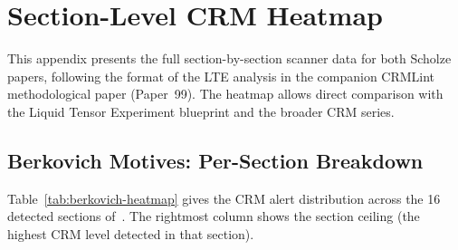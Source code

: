 \documentclass[11pt,a4paper]{article}
\theoremstyle{plain}
\theoremstyle{definition}
\begin{document}
\section{Section-Level CRM Heatmap}\label{app:heatmap}

This appendix presents the full section-by-section scanner data for both Scholze papers, following the format of the LTE analysis in the companion CRMLint methodological paper (Paper~99).  The heatmap allows direct comparison with the Liquid Tensor Experiment blueprint and the broader CRM series.

\subsection{Berkovich Motives: Per-Section Breakdown}

Table~\ref{tab:berkovich-heatmap} gives the CRM alert distribution across the 16 detected sections of~\cite{scholze-berkovich}.  The rightmost column shows the section ceiling (the highest CRM level detected in that section).
\end{document}
